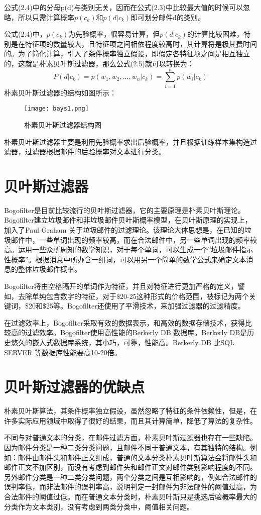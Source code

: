 公式(2.4)中的分母p(d)与类别无关，因而在公式(2.3)中比较最大值的时候可以忽略，所以只需计算概率$p(c_k)$和$p(d|c_k)$即可划分邮件d的类别。

公式(2.4)中，$p(c_k)$为先验概率，很容易计算，但$p(d|c_k)$的计算比较困难，特别是在特征项的数量较大，且特征项之间相依程度较高时，其计算将是极其费时间的。为了简化计算，引入了条件概率独立假设，即假定各特征项之间是相互独立的，这就是朴素贝叶斯过滤器，那么公式(2.5)就可以转换为：
\begin{equation}
 P(d|c_k) = p(w_1,w_2,...,w_n|c_k)=\sum\limits_{i=1}^{n}p(w_i|c_k)
\end{equation}
朴素贝叶斯过滤器的结构如图所示：
\begin{figure}[htbp]
\centering
\texttt{[image: bays1.png]}
\caption{朴素贝叶斯过滤器结构图}
\label{fig:logo}
\end{figure}
朴素贝叶斯过滤器主要是利用先验概率求出后验概率，并且根据训练样本集构造过滤器，过滤器根据邮件的后验概率对文本进行分类。
\section{贝叶斯过滤器}
Bogofilter是目前比较流行的贝叶斯过滤器，它的主要原理是朴素贝叶斯理论。Bogofilter建立垃圾邮件和非垃圾邮件贝叶斯概率模型，在贝叶斯原理的实现上，加入了Paul Graham 关于垃圾邮件的过滤理论。该理论大体思想是，在已知的垃圾邮件中，一些单词出现的频率较高，而在合法邮件中，另一些单词出现的频率较高。运用一些众所周知的数学知识，对于每个单词，可以生成一个”垃圾邮件指示性概率”。根据消息中所办含一组词，可以用另一个简单的数学公式来确定文本消息的整体垃圾邮件概率。

Bogofilter将由空格隔开的单词作为特征，并且对特征进行更加严格的定义，譬如，去除单纯包含数字的特征，对于\$20-25这种形式的价格范围，被标记为两个关键词，\$20和\$25等。Bogofilter还使用了平滑技术，来加强过滤器的过滤精度。

 在过滤效率上，Bogofilter采取有效的数据表示，和高效的数据存储技术，获得比较高的过滤效率。Bogofilter使用高性能的Berkerly DB 数据库。Berkerly DB是历史悠久的嵌入式数据库系统，其小巧，可靠，性能高。Berkerly DB 比SQL SERVER 等数据库性能要高10-20倍。
\section{贝叶斯过滤器的优缺点}
朴素贝叶斯算法，其条件概率独立假设，虽然忽略了特征的条件依赖性，但是，在许多实际应用领域中取得了很好的结果，而且其计算简单，降低了算法的复杂性。

 不同与对普通文本的分类，在邮件过滤方面，朴素贝叶斯过滤器也存在一些缺陷。因为邮件分类是一种二类分类问题，且邮件不同于普通文本，有其独特的结构。例如：邮件由邮件头和邮件正文组成，普通的文本分类朴素贝叶斯算法会将邮件头和邮件正文不加区别，而没有考虑到邮件头和邮件正文对邮件类别影响程度的不同。另外邮件分类是一种二类分类问题，两个分类之间是互相影响的，例如合法邮件的误判率低，而非法邮件的误判率高，说明判定一封邮件为非法邮件的阈值过高，为合法邮件的阈值过低。而在普通文本分类时，朴素贝叶斯只是挑选后验概率最大的分类作为文本类别，没有考虑到两类分类中，阈值相关问题。
 
